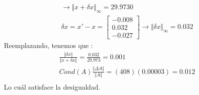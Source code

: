 \documentclass{article}
\begin{document}
\begin{enumerate}
\begin{gather*}
\rightarrow \Vert x + \delta x \Vert_{\infty} = 29.9730 \\
\delta x = x' - x = \begin{bmatrix} -0.008\\0.032\\-0.027 \end{bmatrix} \rightarrow \Vert \delta x \Vert_{\infty} = 0.032
\end{gather*}
Reemplazando, tenemos que :
\begin{gather*}
\frac{ \Vert \delta x \Vert }{ \Vert x + \delta x \Vert } = \frac{0.032}{29.973} = 0.001 \\
Cond(A) \frac{ \Vert \Delta A \Vert }{ \Vert A \Vert } = (408)(0.00003) = 0.012 \\
\end{gather*}
Lo cu\'al satisface la desigualdad.


\end{enumerate}
\end{document}
